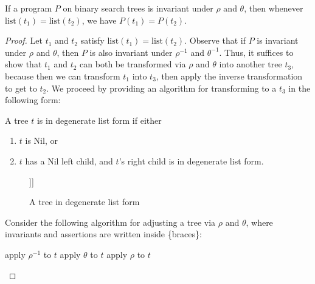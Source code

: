 \documentclass{llncs}
\newcommand{\e}{\emptyset}
\begin{document}
\begin{theorem}
  If a program $P$ on binary search trees is invariant under $\rho$
  and $\theta$, then whenever $\mathrm{list}(t_1) = \mathrm{list}(t_2)$,
  we have $P(t_1) = P(t_2)$.
\end{theorem}
\begin{proof}
  Let $t_1$ and $t_2$ satisfy $\mathrm{list}(t_1) = \mathrm{list}(t_2)$.
  Observe that if $P$ is invariant under $\rho$ and $\theta$,
  then $P$ is also invariant under $\rho^{-1}$ and $\theta^{-1}$.
  Thus, it suffices to show that $t_1$ and $t_2$ can both be transformed
  via $\rho$ and $\theta$ into another tree $t_3$,
  because then we can transform $t_1$ into $t_3$, then apply the inverse
  transformation to get to $t_2$.
  We proceed by providing an algorithm for transforming to a $t_3$
  in the following form:


  \begin{definition}
    A tree $t$ is in degenerate list form if either
    \begin{enumerate}
      \item $t$ is Nil, or
      \item $t$ has a Nil left child, and $t$'s right child is in degenerate
        list form.
    \end{enumerate}
  \end{definition}

  \begin{figure}[H]
    \Tree [.a $\e$ [.b $\e$ [.c $\e$ d ]]]
    \caption{A tree in degenerate list form}
  \end{figure}


  Consider the following algorithm for adjusting a tree via $\rho$ and $\theta$,
  where invariants and assertions are written inside \{braces\}:
  \begin{algorithm}[H]
    \begin{algorithmic}[1]
          \State apply $\rho^{-1}$ to $t$
        \EndWhile
         \label{null-right}
            \State apply $\theta$ to $t$
          \EndWhile
            \label{null-left-right}
          \State apply $\rho$ to $t$
        \EndWhile
      \EndFunction
    \end{algorithmic}
  \end{algorithm} 


\end{proof}
\end{document}
